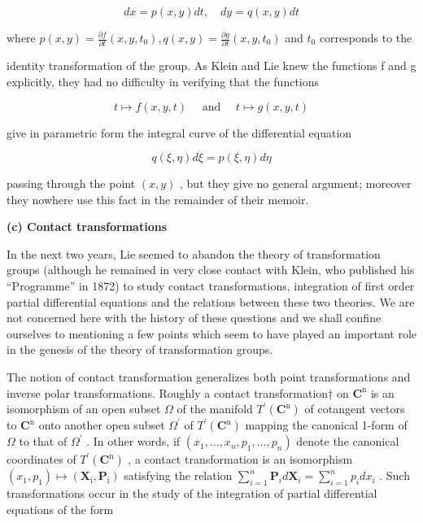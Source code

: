 \[
d x = p (x, y) d t, \quad d y = q (x, y) d t
\]

where \(p(x,y) = \frac{\partial f}{\partial t} (x,y,t_0), q(x,y) = \frac{\partial g}{\partial t} (x,y,t_0)\) and \(t_0\) corresponds to the

identity transformation of the group. As Klein and Lie knew the functions f and g explicitly, they had no difficulty in verifying that the functions

\[
t \mapsto f (x, y, t) \quad \text { and } \quad t \mapsto g (x, y, t)
\]

give in parametric form the integral curve of the differential equation

\[
q (\xi , \eta) d \xi = p (\xi , \eta) d \eta
\]

passing through the point \((x,y)\) , but they give no general argument; moreover they nowhere use this fact in the remainder of their memoir.

\textbf{(c) Contact transformations}

In the next two years, Lie seemed to abandon the theory of transformation groups (although he remained in very close contact with Klein, who published his ``Programme'' in 1872) to study contact transformations, integration of first order partial differential equations and the relations between these two theories. We are not concerned here with the history of these questions and we shall confine ourselves to mentioning a few points which seem to have played an important role in the genesis of the theory of transformation groups.

The notion of contact transformation generalizes both point transformations and inverse polar transformations. Roughly a contact transformation† on \(\mathbf{C}^{\mathrm{n}}\) is an isomorphism of an open subset \(\Omega\) of the manifold \(T^{\prime}(\mathbf{C}^{\mathrm{n}})\) of cotangent vectors to \(\mathbf{C}^{\mathrm{n}}\) onto another open subset \(\Omega^{\prime}\) of \(T^{\prime}(\mathbf{C}^{\mathrm{n}})\) mapping the canonical 1-form of \(\Omega\) to that of \(\Omega^{\prime}\) . In other words, if \((x_{1},\ldots ,x_{n},p_{1},\ldots ,p_{n})\) denote the canonical coordinates of \(T^{\prime}(\mathbf{C}^{\mathrm{n}})\) , a contact transformation is an isomorphism \((x_{1},p_{1})\mapsto (\mathbf{X}_{\mathrm{i}},\mathbf{P}_{\mathrm{i}})\) satisfying the relation \(\sum_{i = 1}^{n}\mathbf{P}_{i}d\mathbf{X}_{i} = \sum_{i = 1}^{n}p_{i}dx_{i}\) . Such transformations occur in the study of the integration of partial differential equations of the form

